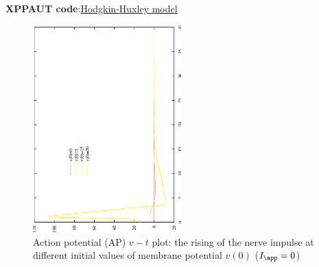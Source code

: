 {\bf XPPAUT code}:\hyperref[HH_model]{Hodgkin-Huxley model}



\begin{figure}[!hbt]
 \centerline{\includegraphics[height=8cm,angle=-90]{./images/HH_model1.eps}}
 \caption{Action potential (AP) $v-t$ plot: the rising of the nerve impulse at
 different initial values of membrane potential $v(0)$ ($I_\app=0$)}
\label{fig:HH1}
\end{figure}



